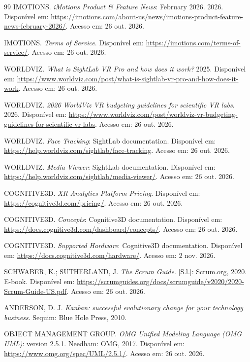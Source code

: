 \documentclass[conference,a4paper,10pt]{IEEEtran}
\begin{document}
\begin{thebibliography}{99}
 IMOTIONS. \textit{iMotions Product \& Feature News}: February 2026. 2026. Disponível em: \url{https://imotions.com/about-us/news/imotions-product-feature-news-february-2026/}. Acesso em: 26 out. 2026.

 IMOTIONS. \textit{Terms of Service}. Disponível em: \url{https://imotions.com/terms-of-service/}. Acesso em: 26 out. 2026.

 WORLDVIZ. \textit{What is SightLab VR Pro and how does it work?} 2025. Disponível em: \url{https://www.worldviz.com/post/what-is-sightlab-vr-pro-and-how-does-it-work}. Acesso em: 26 out. 2026.

 WORLDVIZ. \textit{2026 WorldViz VR budgeting guidelines for scientific VR labs}. 2026. Disponível em: \url{https://www.worldviz.com/post/worldviz-vr-budgeting-guidelines-for-scientific-vr-labs}. Acesso em: 26 out. 2026.

 WORLDVIZ. \textit{Face Tracking}: SightLab documentation. Disponível em: \url{https://help.worldviz.com/sightlab/face-tracking}. Acesso em: 26 out. 2026.

 WORLDVIZ. \textit{Media Viewer}: SightLab documentation. Disponível em: \url{https://help.worldviz.com/sightlab/media-viewer/}. Acesso em: 26 out. 2026.

 COGNITIVE3D. \textit{XR Analytics Platform Pricing}. Disponível em: \url{https://cognitive3d.com/pricing/}. Acesso em: 26 out. 2026.

 COGNITIVE3D. \textit{Concepts}: Cognitive3D documentation. Disponível em: \url{https://docs.cognitive3d.com/dashboard/concepts/}. Acesso em: 26 out. 2026.

 COGNITIVE3D. \textit{Supported Hardware}: Cognitive3D documentation. Disponível em: \url{https://docs.cognitive3d.com/hardware/}. Acesso em: 2 nov. 2026.

 SCHWABER, K.; SUTHERLAND, J. \textit{The Scrum Guide}. [S.l.]: Scrum.org, 2020. E-book. Disponível em: \url{https://scrumguides.org/docs/scrumguide/v2020/2020-Scrum-Guide-US.pdf}. Acesso em: 26 out. 2026.

 ANDERSON, D. J. \textit{Kanban: successful evolutionary change for your technology business}. Sequim: Blue Hole Press, 2010.

 OBJECT MANAGEMENT GROUP. \textit{OMG Unified Modeling Language (OMG UML)}: version 2.5.1. Needham: OMG, 2017. Disponível em: \url{https://www.omg.org/spec/UML/2.5.1/}. Acesso em: 26 out. 2026.


\end{thebibliography}
\end{document}
